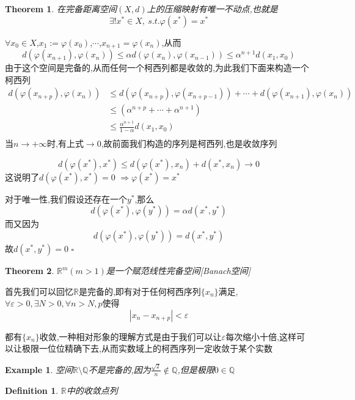 \documentclass[11pt,hyperref,a4paper,UTF8]{ctexart}
\newtheorem{theorem}{Theorem}[subsection]
\newtheorem{example}{Example}[subsection]
\newtheorem{definition}{Definition}[subsection]
\newenvironment{cproof}{%
\heiti{证明}\kaishu
}{%
  \hfill $\square$
  \par\bigskip
}
\newcommand{\RR}{\mathbb{R}}
\newcommand{\QQ}{\mathbb{Q}}
\begin{document}
\begin{CJK}{UTF8}{gkai}
\begin{theorem}
  在完备距离空间$(X,d)$上的压缩映射有唯一不动点,也就是
  \[\exists! x^\ast \in X,~s.t. \varphi(x^\ast) = x^\ast\]
\end{theorem}

\begin{cproof}
  $\forall x_0 \in X$,$x_1 := \varphi(x_0)$,$\cdots$,$x_{n + 1} = \varphi(x_n)$,从而
  \[d(\varphi(x_{n + 1}), \varphi(x_n)) \leq \alpha d(\varphi(x_n),\varphi(x_{n - 1})) \leq \alpha^{n + 1} d(x_1,x_0)\]
  由于这个空间是完备的,从而任何一个柯西列都是收敛的,为此我们下面来构造一个柯西列
  \[
  \begin{aligned}  
    d(\varphi(x_{n + p}),\varphi(x_n)) &\leq d(\varphi(x_{n + p}),\varphi(x_{n + p - 1})) + \cdots + d(\varphi(x_{n + 1}),\varphi(x_n))\\
    &\leq(\alpha^{n + p} + \cdots + \alpha^{n + 1})\\
    &\leq \frac{\alpha^{n + 1}}{1 - \alpha} d(x_1,x_0) \\
  \end{aligned}  
  \]
  当$n\to +\infty$时,有上式$\to 0$,故前面我们构造的序列是柯西列,也是收敛序列

  \[d(\varphi(x^\ast),x^\ast) \leq d(\varphi(x^\ast),x_n) + d(x^\ast,x_n) \to 0\]
  这说明了$d(\varphi(x^\ast),x^\ast) = 0$ $\Rightarrow \varphi(x^\ast) = x^\ast$

  对于唯一性,我们假设还存在一个$y^\ast$,那么
  \[d(\varphi(x^\ast),\varphi(y^\ast)) = \alpha d(x^\ast,y^\ast) \]
  而又因为
  \[d(\varphi(x^\ast),\varphi(y^\ast)) =d(x^\ast,y^\ast) \]
  故$d(x^\ast,y^\ast) = 0$
\end{cproof}

\begin{theorem}
  $\RR^m(m > 1)$是一个赋范线性完备空间[Banach空间]
\end{theorem}
首先我们可以回忆$\RR$是完备的,即有对于任何柯西序列$\{x_n\}$满足,$\forall \varepsilon > 0, \exists N > 0,\forall n > N,p$使得
\[|x_n - x_{n + p} | < \varepsilon\]

都有$\{x_n\}$收敛,一种相对形象的理解方式是由于我们可以让$\varepsilon$每次缩小十倍,这样可以让极限一位位精确下去,从而实数域上的柯西序列一定收敛于某个实数

\begin{example}
  空间$\RR \setminus \QQ$不是完备的,因为$\frac{\sqrt{2}}{n} \notin \QQ$,但是极限$0 \in \QQ$
\end{example}

\begin{definition}
  $\RR$中的收敛点列\\


\end{definition}
\end{CJK}
\end{document}
